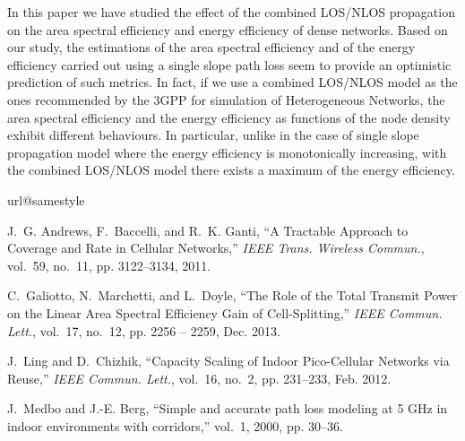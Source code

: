 \documentclass[twocoumn]{IEEEtran}
\begin{document}
In this paper we have studied the effect of the combined LOS/NLOS
propagation on the area spectral efficiency and energy efficiency
of dense networks. Based on our study, the estimations of the area
spectral efficiency and of  the energy efficiency carried out using a single slope path
loss seem to provide an optimistic prediction of such metrics. In
fact, if we use a combined LOS/NLOS model as the ones recommended
by the 3GPP for simulation of Heterogeneous Networks, the area spectral
efficiency and the energy efficiency as functions of the node density
exhibit different behaviours. In particular, unlike in the case of
single slope propagation model where the energy efficiency is monotonically
increasing, with the combined LOS/NLOS model there exists a maximum
of the energy efficiency. 

\begin{thebibliography}{1}
\providecommand{\url}[1]{#1}
\csname url@samestyle\endcsname
\providecommand{\newblock}{\relax}
\providecommand{\bibinfo}[2]{#2}
\providecommand{\BIBentrySTDinterwordspacing}{\spaceskip=0pt\relax}
\providecommand{\BIBentryALTinterwordstretchfactor}{4}
\providecommand{\BIBentryALTinterwordspacing}{\spaceskip=\fontdimen2\font plus
\BIBentryALTinterwordstretchfactor\fontdimen3\font minus
  \fontdimen4\font\relax}
\providecommand{\BIBforeignlanguage}[2]{{\expandafter\ifx\csname l@#1\endcsname\relax
\typeout{** WARNING: IEEEtran.bst: No hyphenation pattern has been}\typeout{** loaded for the language `#1'. Using the pattern for}\typeout{** the default language instead.}\else
\language=\csname l@#1\endcsname
\fi
#2}}
\providecommand{\BIBdecl}{\relax}
\BIBdecl

J.~G. Andrews, F.~Baccelli, and R.~K. Ganti, ``{A Tractable Approach to
  Coverage and Rate in Cellular Networks},'' \emph{IEEE Trans. Wireless
  Commun.}, vol.~59, no.~11, pp. 3122--3134, 2011.

C.~Galiotto, N.~Marchetti, and L.~Doyle, ``{The Role of the Total Transmit
  Power on the Linear Area Spectral Efficiency Gain of Cell-Splitting},''
  \emph{IEEE Commun. Lett.}, vol.~17, no.~12, pp. 2256 -- 2259, Dec. 2013.

J.~Ling and D.~Chizhik, ``{Capacity Scaling of Indoor Pico-Cellular Networks
  via Reuse},'' \emph{IEEE Commun. Lett.}, vol.~16, no.~2, pp. 231--233, Feb.
  2012.

J.~Medbo and J.-E. Berg, ``{Simple and accurate path loss modeling at 5 GHz in
  indoor environments with corridors},'' vol.~1, 2000, pp. 30--36.


\end{thebibliography}
\end{document}
